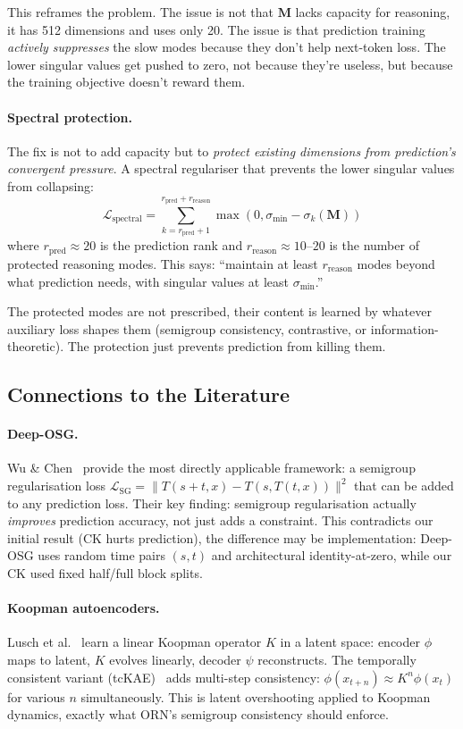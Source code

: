 \documentclass[11pt, a4paper]{article}
\newcommand{\M}{\mathbf{M}}
\theoremstyle{plain}
\theoremstyle{remark}
\begin{document}
This reframes the problem.
The issue is not that $\M$ lacks capacity for reasoning, it has 512 dimensions and uses only 20.
The issue is that prediction training \emph{actively suppresses} the slow modes because they don't help next-token loss.
The lower singular values get pushed to zero, not because they're useless, but because the training objective doesn't reward them.

\paragraph{Spectral protection.}
The fix is not to add capacity but to \emph{protect existing dimensions from prediction's convergent pressure}.
A spectral regulariser that prevents the lower singular values from collapsing:
\[
\mathcal{L}_{\text{spectral}} = \sum_{k=r_{\text{pred}}+1}^{r_{\text{pred}}+r_{\text{reason}}} \max(0, \sigma_{\min} - \sigma_k(\M))
\]
where $r_{\text{pred}} \approx 20$ is the prediction rank and $r_{\text{reason}} \approx 10$--$20$ is the number of protected reasoning modes.
This says: ``maintain at least $r_{\text{reason}}$ modes beyond what prediction needs, with singular values at least $\sigma_{\min}$.''

The protected modes are not prescribed, their content is learned by whatever auxiliary loss shapes them (semigroup consistency, contrastive, or information-theoretic).
The protection just prevents prediction from killing them.

\subsection{Connections to the Literature}

\paragraph{Deep-OSG.}
Wu \& Chen~\cite{deeposg2023} provide the most directly applicable framework: a semigroup regularisation loss $\mathcal{L}_{\text{SG}} = \|T(s{+}t, x) - T(s, T(t, x))\|^2$ that can be added to any prediction loss.
Their key finding: semigroup regularisation actually \emph{improves} prediction accuracy, not just adds a constraint.
This contradicts our initial result (CK hurts prediction), the difference may be implementation: Deep-OSG uses random time pairs $(s, t)$ and architectural identity-at-zero, while our CK used fixed half/full block splits.

\paragraph{Koopman autoencoders.}
Lusch et al.~\cite{koopman_deep} learn a linear Koopman operator $K$ in a latent space: encoder $\phi$ maps to latent, $K$ evolves linearly, decoder $\psi$ reconstructs.
The temporally consistent variant (tcKAE)~\cite{tckae2025} adds multi-step consistency: $\phi(x_{t+n}) \approx K^n \phi(x_t)$ for various $n$ simultaneously.
This is latent overshooting applied to Koopman dynamics, exactly what ORN's semigroup consistency should enforce.
\end{document}
